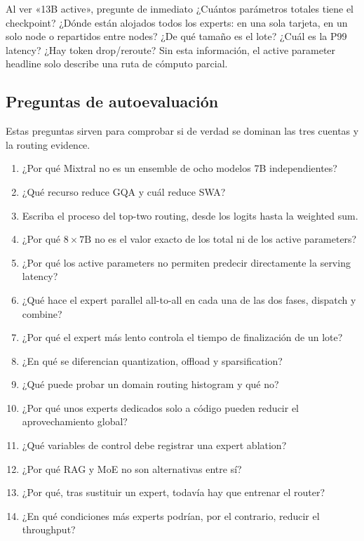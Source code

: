 \documentclass[a4paper]{article}
\begin{document}
\begin{warningbox}{Al ver «13B active», pregunte de inmediato}
¿Cuántos parámetros totales tiene el checkpoint? ¿Dónde están alojados todos los experts: en una sola tarjeta, en un solo node o repartidos entre nodes? ¿De qué tamaño es el lote? ¿Cuál es la P99 latency? ¿Hay token drop/reroute? Sin esta información, el active parameter headline solo describe una ruta de cómputo parcial.
\end{warningbox}

\subsection{Preguntas de autoevaluación}

Estas preguntas sirven para comprobar si de verdad se dominan las tres cuentas y la routing evidence.

\begin{enumerate}
  \item ¿Por qué Mixtral no es un ensemble de ocho modelos 7B independientes?
  \item ¿Qué recurso reduce GQA y cuál reduce SWA?
  \item Escriba el proceso del top-two routing, desde los logits hasta la weighted sum.
  \item ¿Por qué $8\times 7\mathrm{B}$ no es el valor exacto de los total ni de los active parameters?
  \item ¿Por qué los active parameters no permiten predecir directamente la serving latency?
  \item ¿Qué hace el expert parallel all-to-all en cada una de las dos fases, dispatch y combine?
  \item ¿Por qué el expert más lento controla el tiempo de finalización de un lote?
  \item ¿En qué se diferencian quantization, offload y sparsification?
  \item ¿Qué puede probar un domain routing histogram y qué no?
  \item ¿Por qué unos experts dedicados solo a código pueden reducir el aprovechamiento global?
  \item ¿Qué variables de control debe registrar una expert ablation?
  \item ¿Por qué RAG y MoE no son alternativas entre sí?
  \item ¿Por qué, tras sustituir un expert, todavía hay que entrenar el router?
  \item ¿En qué condiciones más experts podrían, por el contrario, reducir el throughput?
\end{enumerate}
\end{document}
